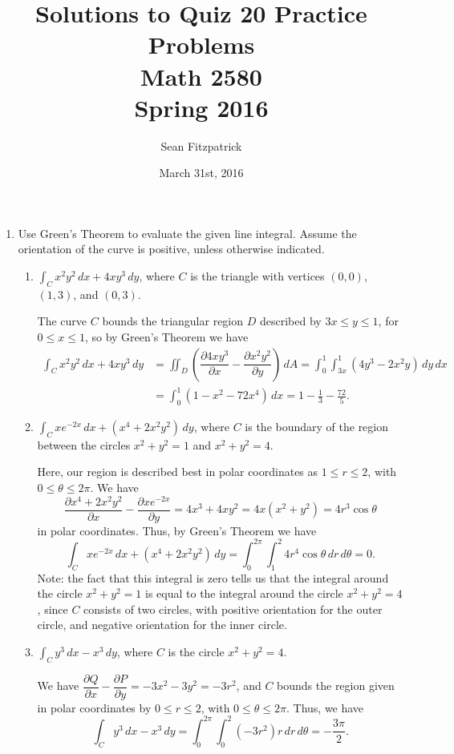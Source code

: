 \documentclass[letterpaper,12pt]{article}
\title{Solutions to Quiz 20 Practice Problems\\Math 2580\\Spring 2016}
\author{Sean Fitzpatrick}
\date{March 31st, 2016}
\newcommand{\pd}[2]{\dfrac{\partial #1}{\partial #2}}
\begin{document}
 \maketitle



\begin{enumerate}
 \item Use Green's Theorem to evaluate the given line integral. Assume the orientation of the curve is positive, unless otherwise indicated.
\begin{enumerate}
 \item $\int_C x^2y^2\,dx+4xy^3\,dy$, where $C$ is the triangle with vertices $(0,0)$, $(1,3)$, and $(0,3)$.

\bigskip

The curve $C$ bounds the triangular region $D$ described by $3x\leq y\leq 1$, for $0\leq x\leq 1$, so by Green's Theorem we have
\begin{align*}
 \int_C x^2y^2\,dx + 4xy^3\,dy &= \iint_D \left(\pd{4xy^3}{x}-\pd{x^2y^2}{y}\right)\,dA = \int_0^1\int_{3x}^1(4y^3-2x^2y)\,dy\,dx\\
& = \int_0^1(1-x^2-72x^4)\,dx = 1-\frac{1}{3}-\frac{72}{5}.
\end{align*}

 \item $\int_C xe^{-2x}\,dx+(x^4+2x^2y^2)\,dy$, where $C$ is the boundary of the region between the circles $x^2+y^2=1$ and $x^2+y^2=4$.

\bigskip

Here, our region is described best in polar coordinates as $1\leq r\leq 2$, with $0\leq \theta\leq 2\pi$. We have
\[
 \pd{x^4+2x^2y^2}{x}-\pd{xe^{-2x}}{y} = 4x^3+4xy^2 = 4x(x^2+y^2) = 4r^3\cos\theta
\]
in polar coordinates. Thus, by Green's Theorem we have
\[
 \int_C xe^{-2x}\,dx+(x^4+2x^2y^2)\,dy = \int_0^{2\pi}\int_1^2 4r^4\cos\theta \,dr\,d\theta = 0.
\]
Note: the fact that this integral is zero tells us that the integral around the circle $x^2+y^2=1$ is equal to the integral around the circle $x^2+y^2=4$, since $C$ consists of two circles, with positive orientation for the outer circle, and negative orientation for the inner circle.

 \item $\int_C y^3\,dx-x^3\,dy$, where $C$ is the circle $x^2+y^2=4$.

\bigskip

We have $\pd{Q}{x}-\pd{P}{y} = -3x^2-3y^2 = -3r^2$, and $C$ bounds the region given in polar coordinates by $0\leq r\leq 2$, with $0\leq \theta \leq 2\pi$. Thus, we have
\[
 \int_C y^3\,dx-x^3\,dy = \int_0^{2\pi}\int_0^2 (-3r^2)r\,dr\,d\theta = -\frac{3\pi}{2}.
\]


\end{enumerate}
\end{enumerate}
\end{document}
